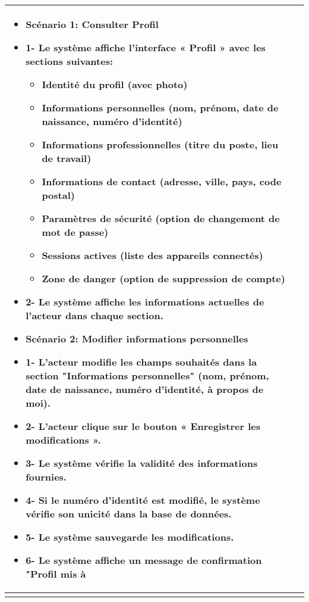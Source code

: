 \begin{longtable}{|>{\arraybackslash}p{4.2cm}|>{\arraybackslash}p{12.5cm}|}
\begin{itemize}[label=]
  \item\textbf{Scénario 1: Consulter Profil}
    \item{1-} Le système affiche l'interface « Profil » avec les sections suivantes:
    \begin{itemize}
      \item Identité du profil (avec photo)
      \item Informations personnelles (nom, prénom, date de naissance, numéro d'identité)
      \item Informations professionnelles (titre du poste, lieu de travail)
      \item Informations de contact (adresse, ville, pays, code postal)
      \item Paramètres de sécurité (option de changement de mot de passe)
      \item Sessions actives (liste des appareils connectés)
      \item Zone de danger (option de suppression de compte)
    \end{itemize}
    \item{2-} Le système affiche les informations actuelles de l'acteur dans chaque section.
   \item\textbf{Scénario 2: Modifier informations personnelles}
   \item{1-} L'acteur modifie les champs souhaités dans la section "Informations personnelles" (nom, prénom, date de naissance, numéro d'identité, à propos de moi).
 \item{2-} L'acteur clique sur le bouton « Enregistrer les modifications ».
    \item{3-} Le système vérifie la validité des informations fournies.

     \item{4-} Si le numéro d'identité est modifié, le système vérifie son unicité dans la base de données.
    \item{5-} Le système sauvegarde les modifications.
    \item{6-} Le système affiche un message de confirmation "Profil mis à


\end{itemize} \\
\hline
\textbf{}&
\begin{itemize}[label=]


\end{itemize}
\end{longtable}
